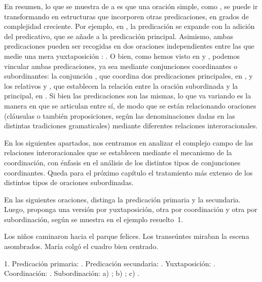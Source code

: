 En resumen, lo que se muestra de  a 
es que una oración simple, como  , se puede ir transformando en estructuras que incorporen otras
predicaciones, en grados de complejidad creciente. Por ejemplo, en
 , la
predicación se expande con la adición del predicativo, que se añade a la
predicación principal. Asimismo, ambas predicaciones pueden ser recogidas en dos
oraciones independientes entre las que medie una mera yuxtaposición
: . O
bien, como hemos visto en  y ,
podemos vincular ambas predicaciones, ya sea mediante conjunciones coordinantes
o subordinantes: la conjunción , que coordina dos predicaciones
principales, en , y los relativos  y
, que establecen la relación entre la oración subordinada y la
principal, en . Si bien las predicaciones son las mismas,
lo que va variando es la manera en que se articulan entre sí, de modo que se
están relacionando oraciones (cláusulas o también proposiciones, según las
denominaciones dadas en las distintas tradiciones gramaticales) mediante
diferentes relaciones interoracionales.

En los siguientes apartados, nos centramos en analizar el complejo campo de las
relaciones interoracionales que se establecen mediante el mecanismo de la
coordinación, con énfasis en el análisis de los distintos tipos de conjunciones
coordinantes. Queda para el próximo capítulo el tratamiento más extenso de los
distintos tipos de oraciones subordinadas.

\begin{ejercicio}\label{ej:12-predicaciones}
En las siguientes oraciones, distinga la predicación primaria y la secundaria.
Luego, proponga una versión por yuxtaposición, otra por coordinación y otra por
subordinación, según se muestra en el ejemplo resuelto~1.

\begin{exe}
  \ex Los niños caminaron hacia el parque felices.
  \ex Los transeúntes miraban la escena asombrados.
  \ex María colgó el cuadro bien centrado.
\end{exe}

\begin{resuelto}
1. Predicación primaria: .
Predicación secundaria: . Yuxtaposición:
. Coordinación:
. Subordinación: a)
; b) ; c) .
\end{resuelto}
\end{ejercicio}

